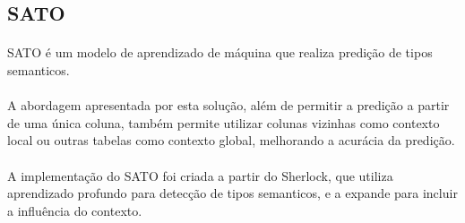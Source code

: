 \subsection{SATO}

\paragraph{} SATO\cite{zhang2019sato} é um modelo de aprendizado de máquina que realiza predição de tipos semanticos.

\paragraph{} A abordagem apresentada por esta solução, além de permitir a predição a partir de uma única coluna, também permite utilizar colunas vizinhas como contexto local ou outras tabelas como contexto global, melhorando a acurácia da predição.

\paragraph{} A implementação do SATO foi criada a partir do Sherlock\cite{hulsebos2019sherlock}, que utiliza aprendizado profundo para detecção de tipos semanticos, e a expande para incluir a influência do contexto.


